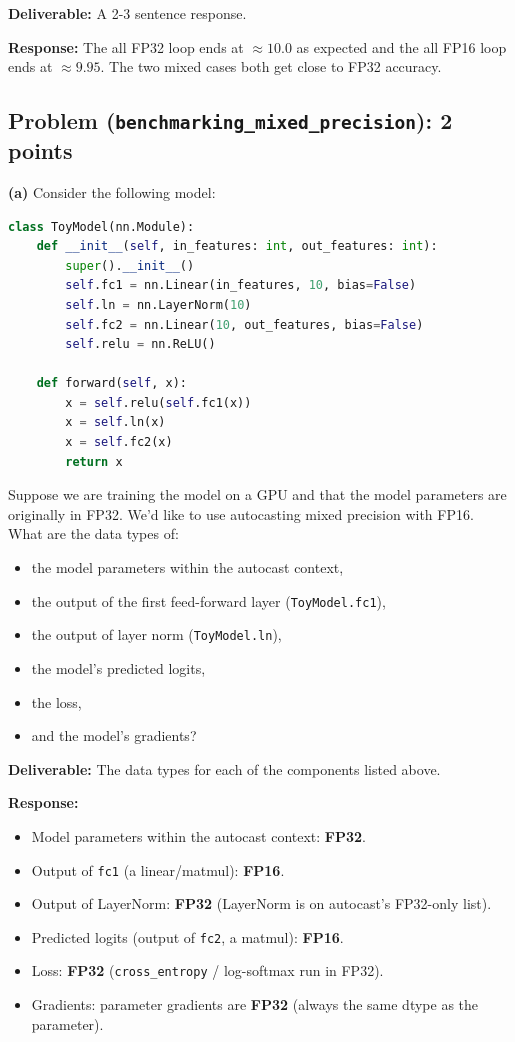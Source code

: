 \documentclass[11pt]{article}
\begin{document}
\textbf{Deliverable:} A 2-3 sentence response.

\vspace{0.25cm}
\textbf{Response:}
The all FP32 loop ends at $\approx 10.0$ as expected and the all FP16 loop ends at $\approx 9.95$. The two mixed cases both get close to FP32 accuracy.

\subsection*{Problem (\texttt{benchmarking\_mixed\_precision}): 2 points}

\textbf{(a)} Consider the following model:

\begin{lstlisting}[language=Python]
class ToyModel(nn.Module):
    def __init__(self, in_features: int, out_features: int):
        super().__init__()
        self.fc1 = nn.Linear(in_features, 10, bias=False)
        self.ln = nn.LayerNorm(10)
        self.fc2 = nn.Linear(10, out_features, bias=False)
        self.relu = nn.ReLU()

    def forward(self, x):
        x = self.relu(self.fc1(x))
        x = self.ln(x)
        x = self.fc2(x)
        return x
\end{lstlisting}

Suppose we are training the model on a GPU and that the model parameters are originally in FP32. We'd like to use autocasting mixed precision with FP16. What are the data types of:
\begin{itemize}
    \item the model parameters within the autocast context,
    \item the output of the first feed-forward layer (\texttt{ToyModel.fc1}),
    \item the output of layer norm (\texttt{ToyModel.ln}),
    \item the model's predicted logits,
    \item the loss,
    \item and the model's gradients?
\end{itemize}

\textbf{Deliverable:} The data types for each of the components listed above.

\vspace{0.25cm}
\textbf{Response:}
\begin{itemize}
    \item Model parameters within the autocast context: \textbf{FP32}.
    \item Output of \texttt{fc1} (a linear/matmul): \textbf{FP16}.
    \item Output of LayerNorm: \textbf{FP32} (LayerNorm is on autocast's FP32-only list).
    \item Predicted logits (output of \texttt{fc2}, a matmul): \textbf{FP16}.
    \item Loss: \textbf{FP32} (\texttt{cross\_entropy} / log-softmax run in FP32).
    \item Gradients: parameter gradients are \textbf{FP32} (always the same dtype as the parameter).
\end{itemize}
\end{document}
